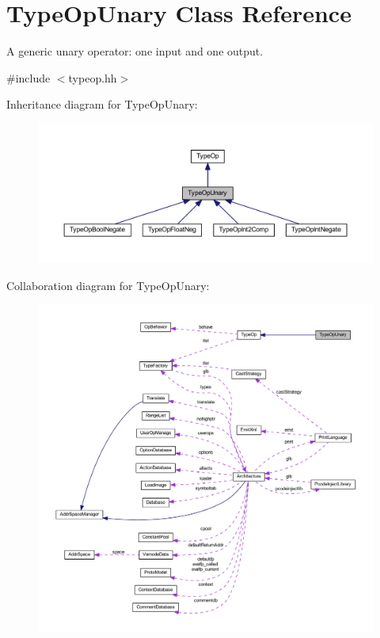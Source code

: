 \hypertarget{class_type_op_unary}{}\section{Type\+Op\+Unary Class Reference}
\label{class_type_op_unary}


A generic unary operator\+: one input and one output.  




{\ttfamily \#include $<$typeop.\+hh$>$}



Inheritance diagram for Type\+Op\+Unary\+:
\nopagebreak
\begin{figure}[H]
\begin{center}
\leavevmode
\includegraphics[width=350pt]{class_type_op_unary__inherit__graph}
\end{center}
\end{figure}


Collaboration diagram for Type\+Op\+Unary\+:
\nopagebreak
\begin{figure}[H]
\begin{center}
\leavevmode
\includegraphics[width=350pt]{class_type_op_unary__coll__graph}
\end{center}
\end{figure}
